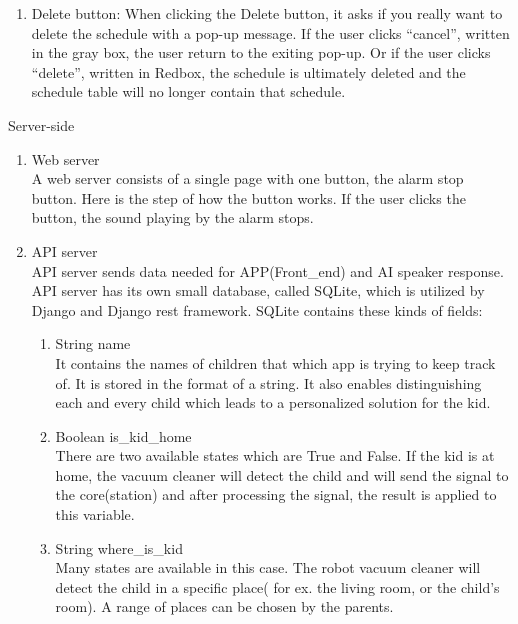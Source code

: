 \documentclass[conference]{IEEEtran}
\begin{document}
\begin{enumerate}[label=\arabic*.]
\begin{enumerate}[label=\alph*.]
\begin{enumerate}[label=\roman*.]
            \item {\large{Delete button: When clicking the Delete button, it asks if you really want to delete the schedule with a pop-up message. If the user clicks “cancel”, written in the gray box, the user return to the exiting pop-up. Or if the user clicks “delete”, written in Redbox, the schedule is ultimately deleted and the schedule table will no longer contain that schedule. }} \\
        \end{enumerate}
    \end{enumerate}
\begin{center}\large{Server-side}\end{center}
\begin{enumerate}[label=\arabic*.]
    \item {\large{Web server}} \\
    A web server consists of a single page with one button, the alarm stop button. Here is the step of how the button works. If the user clicks the button, the sound playing by the alarm stops. \\
    \item {\large{API server}} \\
    API server sends data needed for APP(Front\_end) and AI speaker response. API server has its own small database, called SQLite, which is utilized by Django and Django rest framework. SQLite contains these kinds of fields: \\
    \begin{enumerate}[label=\alph*.]
        \item {\large{String name}} \\
        It contains the names of children that which app is trying to keep track of. It is stored in the format of a string. It also enables distinguishing each and every child which leads to a personalized solution for the kid. \\
        \item {\large{Boolean is\_kid\_home}} \\
        There are two available states which are True and False. If the kid is at home, the vacuum cleaner will detect the child and will send the signal to the core(station) and after processing the signal, the result is applied to this variable. \\
        \item {\large{String where\_is\_kid}} \\
        Many states are available in this case. The robot vacuum cleaner will detect the child in a specific place( for ex. the living room, or the child's room). A range of places can be chosen by the parents. \\

\end{enumerate}
\end{enumerate}
\end{enumerate}
\end{document}
